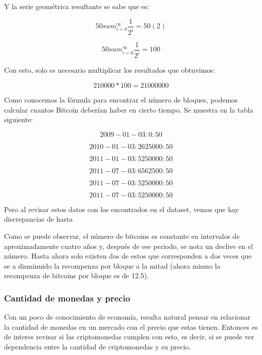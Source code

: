 \documentclass[12pt,letterpaper]{article}
\begin{document}
    Y la serie geom\'etrica resultante se sabe que es:

    $$ 50 sum_{i = 0}^{\infty} \frac{1}{2^{i}} = 50 (2) $$

    $$ 50 sum_{i = 0}^{\infty} \frac{1}{2^{i}} = 100 $$

    Con esto, solo es necesario multiplicar los resultados que obtuvimos:

    $$ 210000 * 100 = 21000000 $$

    Como conocemos la f\'ormula para encontrar el n\'umero de bloques, podemos calcular cuantos Bitcoin deber\'ian haber en cierto tiempo. Se muestra en la tabla siguiente:

    $$ 2009-01-03 : 0  : 50$$
        
    $$ 2010-01-03 : 2625000 : 50  $$

    $$ 2011-01-03 : 5250000 : 50  $$

    $$ 2011-07-03 : 6562500 : 50  $$

    $$ 2011-07-03 : 5250000 : 50  $$

    $$ 2011-07-03 : 5250000 : 50  $$

    Pero al revisar estos datos con los encontrados en el dataset, vemos que hay discrepancias de hasta %



    Como se puede observar, el n\'umero de bitcoins es constante en intervalos de aproximadamente cuatro a\~nos y, despu\'es de ese periodo, se nota un declive en el n\'umero. Hasta ahora solo existen dos de estos que corresponden a dos veces que se a disminuido la recompenza por bloque a la mitad (ahora mismo la recompenza de bitcoins por bloque es de 12.5).


    \subsubsection*{Cantidad de monedas y precio}

    Con un poco de conocimiento de economía, resulta natural pensar en relacionar la cantidad de monedas en un mercado con el precio que estas tienen. Entonces es de interes revisar si las criptomonedas cumplen con esto, es decir, si se puede ver dependencia entre la cantidad de criptomonedas y su precio.

\end{document}
